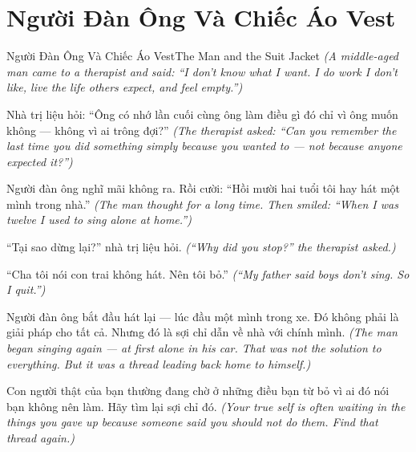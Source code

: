 \section{Người Đàn Ông Và Chiếc Áo Vest}
\begin{truyen}{Người Đàn Ông Và Chiếc Áo Vest}{The Man and the Suit Jacket}
\textit{(A middle-aged man came to a therapist and said: ``I don't know what I want. I do work I don't like, live the life others expect, and feel empty.'')}

Nhà trị liệu hỏi: ``Ông có nhớ lần cuối cùng ông làm điều gì đó chỉ vì ông muốn không — không vì ai trông đợi?''
\textit{(The therapist asked: ``Can you remember the last time you did something simply because you wanted to — not because anyone expected it?'')}

Người đàn ông nghĩ mãi không ra. Rồi cười: ``Hồi mười hai tuổi tôi hay hát một mình trong nhà.''
\textit{(The man thought for a long time. Then smiled: ``When I was twelve I used to sing alone at home.'')}

``Tại sao dừng lại?'' nhà trị liệu hỏi.
\textit{(``Why did you stop?'' the therapist asked.)}

``Cha tôi nói con trai không hát. Nên tôi bỏ.''
\textit{(``My father said boys don't sing. So I quit.'')}

Người đàn ông bắt đầu hát lại — lúc đầu một mình trong xe. Đó không phải là giải pháp cho tất cả. Nhưng đó là sợi chỉ dẫn về nhà với chính mình.
\textit{(The man began singing again — at first alone in his car. That was not the solution to everything. But it was a thread leading back home to himself.)}

\end{truyen}

\begin{baihoc}
Con người thật của bạn thường đang chờ ở những điều bạn từ bỏ vì ai đó nói bạn không nên làm. Hãy tìm lại sợi chỉ đó.
\textit{(Your true self is often waiting in the things you gave up because someone said you should not do them. Find that thread again.)}
\end{baihoc}

